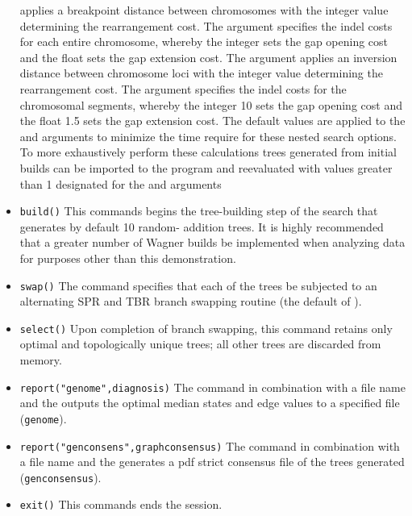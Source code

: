 \begin{itemize}
applies a breakpoint distance between chromosomes with the integer value determining the rearrangement cost. The 
argument  specifies the indel costs for each entire chromosome, whereby the 
integer sets the gap opening cost and the float sets the gap extension cost.  The argument  applies an inversion distance between chromosome loci with the integer value determining the rearrangement 
cost. The argument  specifies the indel costs for the chromosomal segments, 
whereby the integer 10 sets the gap opening cost and the float 1.5 sets the gap extension cost.  The default values 
are applied to the  and  arguments to minimize the time require for 
these nested search options.   To more exhaustively perform these calculations trees generated from initial builds 
can be imported to the program and reevaluated with values greater than 1 designated for the  
and  arguments
\item \texttt{build()} This commands begins the tree-building step of the search that generates by default 10 random-
addition trees.  It is highly recommended that a greater number of Wagner builds be implemented when analyzing 
data for purposes other than this demonstration.
\item \texttt{swap()} The  command specifies that each of the trees be subjected to an alternating 
SPR and TBR branch swapping routine (the default of \poy).
\item \texttt{select()} Upon completion of branch swapping, this command retains only optimal and topologically 
unique trees; all other trees are discarded from memory. 
\item \texttt{report("genome",diagnosis)}  The  command in combination with a file name and the
  outputs the optimal median states and edge values to a specified file (\texttt{genome}). 
\item \texttt{report("genconsens",graphconsensus)}  The  command in combination with a file 
name and the  generates a pdf strict consensus file of the trees generated 
(\texttt{genconsensus}). 
\item \texttt{exit()} This commands ends the \poy session.
\end{itemize}

